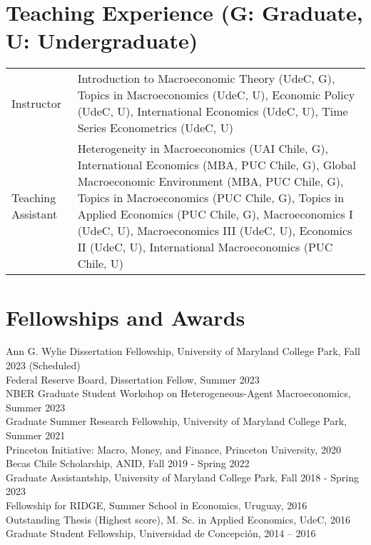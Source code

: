 \documentclass[10pt]{article}
\begin{document}
\section*{Teaching Experience (\footnotesize G: Graduate, U: Undergraduate)}


\begin{tabular}{@{}lp{13cm}}
Instructor& Introduction to Macroeconomic Theory (UdeC, G), Topics in Macroeconomics (UdeC, U), Economic Policy (UdeC, U), International Economics (UdeC, U), Time Series Econometrics (UdeC, U)\\
Teaching Assistant& Heterogeneity in Macroeconomics (UAI Chile, G), International Economics (MBA, PUC Chile, G), Global Macroeconomic Environment (MBA, PUC Chile, G), Topics in Macroeconomics (PUC Chile, G), Topics in Applied Economics (PUC Chile, G), Macroeconomics I (UdeC, U), Macroeconomics III (UdeC, U), Economics II (UdeC, U), International Macroeconomics (PUC Chile, U)
\end{tabular}


\section*{Fellowships and Awards}
Ann G. Wylie Dissertation Fellowship, University of Maryland College Park, Fall 2023  (Scheduled)\\
Federal Reserve Board, Dissertation Fellow, Summer 2023 \\
NBER Graduate Student Workshop on Heterogeneous-Agent Macroeconomics,  Summer 2023\\
Graduate Summer Research Fellowship, University of Maryland College Park, Summer 2021\\
Princeton Initiative: Macro, Money, and Finance, Princeton University, 2020\\
Becas Chile Scholarship, ANID, Fall 2019 - Spring 2022\\
Graduate Assistantship, University of Maryland College Park, Fall 2018 - Spring 2023\\
Fellowship for RIDGE, Summer School in Economics, Uruguay, 2016\\
Outstanding Thesis (Highest score), M. Sc. in Applied Economics, UdeC, 2016\\
Graduate Student Fellowship, Universidad de Concepci\'on, 2014 -- 2016
\end{document}
